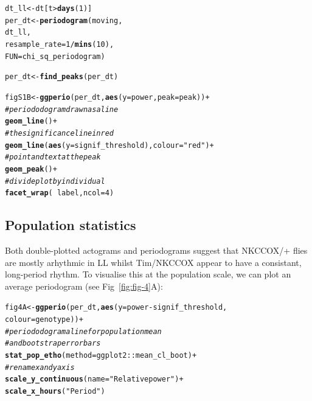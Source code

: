 \documentclass[10pt,letterpaper]{article}\usepackage[]{graphicx}\usepackage[]{color}
\makeatletter
\newcommand{\hlnum}[1]{\textcolor[rgb]{0.686,0.059,0.569}{#1}}%
\newcommand{\hlstr}[1]{\textcolor[rgb]{0.192,0.494,0.8}{#1}}%
\newcommand{\hlcom}[1]{\textcolor[rgb]{0.678,0.584,0.686}{\textit{#1}}}%
\newcommand{\hlopt}[1]{\textcolor[rgb]{0,0,0}{#1}}%
\newcommand{\hlstd}[1]{\textcolor[rgb]{0.345,0.345,0.345}{#1}}%
\newcommand{\hlkwb}[1]{\textcolor[rgb]{0.69,0.353,0.396}{#1}}%
\newcommand{\hlkwc}[1]{\textcolor[rgb]{0.333,0.667,0.333}{#1}}%
\newcommand{\hlkwd}[1]{\textcolor[rgb]{0.737,0.353,0.396}{\textbf{#1}}}%
\newenvironment{kframe}{%
 \def\at@end@of@kframe{}%
 \ifinner\ifhmode%
  \def\at@end@of@kframe{\end{minipage}}%
  \begin{minipage}{\columnwidth}%
 \fi\fi%
 \def\FrameCommand##1{\hskip\@totalleftmargin \hskip-\fboxsep
 \colorbox{shadecolor}{##1}\hskip-\fboxsep
     \hskip-\linewidth \hskip-\@totalleftmargin \hskip\columnwidth}%
 \MakeFramed {\advance\hsize-\width
   \@totalleftmargin\z@ \linewidth\hsize
   \@setminipage}}%
 {\par\unskip\endMakeFramed%
 \at@end@of@kframe}
\newenvironment{knitrout}{}{} %
\makeatother
\begin{document}
\begin{knitrout}
\color{fgcolor}\begin{kframe}
\begin{alltt}
\hlstd{dt_ll} \hlkwb{<-} \hlstd{dt[t} \hlopt{>} \hlkwd{days}\hlstd{(}\hlnum{1}\hlstd{)]}
\hlstd{per_dt} \hlkwb{<-} \hlkwd{periodogram}\hlstd{(moving,}
                        \hlstd{dt_ll,}
                        \hlkwc{resample_rate} \hlstd{=} \hlnum{1}\hlopt{/}\hlkwd{mins}\hlstd{(}\hlnum{10}\hlstd{),}
                        \hlkwc{FUN}\hlstd{=chi_sq_periodogram)}

\hlstd{per_dt} \hlkwb{<-} \hlkwd{find_peaks}\hlstd{(per_dt)}

\hlstd{figS1B} \hlkwb{<-} \hlkwd{ggperio}\hlstd{(per_dt,} \hlkwd{aes}\hlstd{(}\hlkwc{y} \hlstd{= power,} \hlkwc{peak}\hlstd{=peak))} \hlopt{+}
                  \hlcom{# periododogram drawn as a line}
                  \hlkwd{geom_line}\hlstd{()} \hlopt{+}
                  \hlcom{# the significance line in red}
                  \hlkwd{geom_line}\hlstd{(}\hlkwd{aes}\hlstd{(}\hlkwc{y} \hlstd{= signif_threshold),} \hlkwc{colour}\hlstd{=}\hlstr{"red"}\hlstd{)} \hlopt{+}
                  \hlcom{# point and text at the peak}
                  \hlkwd{geom_peak}\hlstd{()} \hlopt{+}
                  \hlcom{# divide plot by individual}
                  \hlkwd{facet_wrap}\hlstd{(} \hlopt{~} \hlstd{label,} \hlkwc{ncol} \hlstd{=} \hlnum{4}\hlstd{)}
\end{alltt}
\end{kframe}
\end{knitrout}

\subsection*{Population statistics}
Both double-plotted actograms and periodograms suggest that NKCCOX/+ flies are mostly 
arhythmic in LL whilst Tim/NKCCOX appear to have a consistant, long-period rhythm.
To visualise this at the population scale, we can plot an average periodogram (see Fig~\ref{fig:fig-4}A):

\begin{knitrout}
\color{fgcolor}\begin{kframe}
\begin{alltt}
\hlstd{fig4A} \hlkwb{<-} \hlkwd{ggperio}\hlstd{(per_dt,} \hlkwd{aes}\hlstd{(}\hlkwc{y} \hlstd{= power} \hlopt{-} \hlstd{signif_threshold,}
                             \hlkwc{colour} \hlstd{= genotype))} \hlopt{+}
          \hlcom{# periododogram a line for population mean}
          \hlcom{# and bootstrap error bars}
          \hlkwd{stat_pop_etho}\hlstd{(}\hlkwc{method} \hlstd{= ggplot2}\hlopt{::}\hlstd{mean_cl_boot)} \hlopt{+}
          \hlcom{# rename x and y axis }
          \hlkwd{scale_y_continuous}\hlstd{(}\hlkwc{name}\hlstd{=}\hlstr{"Relative power"}\hlstd{)} \hlopt{+}
          \hlkwd{scale_x_hours}\hlstd{(}\hlstr{"Period"}\hlstd{)}
\end{alltt}
\end{kframe}
\end{knitrout}
\end{document}
